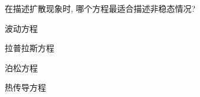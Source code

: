 \documentclass{njustexam}
\begin{document}








\begin{problem}
在描述扩散现象时, 哪个方程最适合描述非稳态情况? 
  \begin{abcd}
    \item 波动方程
    \item 拉普拉斯方程   
    \item 泊松方程
    \item 热传导方程
  \end{abcd}
\end{problem}



\end{document}
